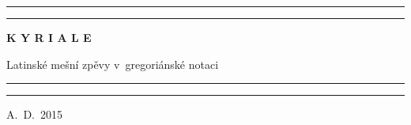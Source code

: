 \documentclass[12pt]{article} %
\begin{document}
\begin{titlepage}
  \begin{center}

    { \vspace*{35 mm} }
    \rule{0.8\textwidth}{1pt}\par
    \vspace{2pt}\vspace{-\baselineskip}
    \rule{0.8\textwidth}{0.4pt}\par
    \vspace{20 mm}

    \begin{Huge}\textbf{K Y R I A L E}\end{Huge}

    \vspace{30 mm}
    \begin{Large}{Latinské mešní zpěvy v~gregoriánské notaci}\end{Large}

    \vspace{20 mm}
    \rule{0.8\textwidth}{0.4pt}\par
    \vspace{2pt}\vspace{-\baselineskip}
    \rule{0.8\textwidth}{1pt}\par

    \vspace{90 mm}
    \begin{large}{A.~D.~2015}\end{large}

  \end{center}
\end{titlepage}


\newpage
\thispagestyle{empty}
\mbox{}
\setcounter{page}{0}





\def\greinitialformat#1{{\fontsize{43}{43}\selectfont #1}}

\redlines




\end{document}
